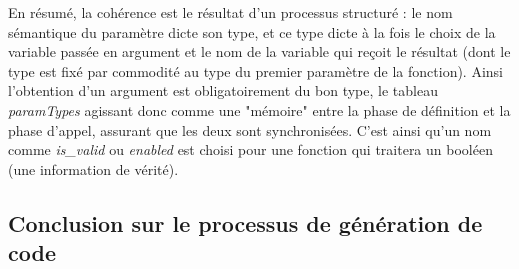 \documentclass[11pt,a4paper]{article}
\newcommand{\var}[1]{\textit{#1}}
\begin{document}
\par En résumé, la cohérence est le résultat d'un processus structuré : le nom sémantique du paramètre dicte son type, et ce type dicte à la fois le choix de la variable passée en argument et le nom de la variable qui reçoit le résultat (dont le type est fixé par commodité au type du premier paramètre de la fonction). Ainsi l'obtention d'un argument est obligatoirement du bon type, le tableau \var{paramTypes} agissant donc comme une "mémoire" entre la phase de définition et la phase d'appel, assurant que les deux sont synchronisées. C'est ainsi qu'un nom comme \var{is\_valid} ou \var{enabled} est choisi pour une fonction qui traitera un booléen (une information de vérité).

\subsection{Conclusion sur le processus de génération de code}
\end{document}
